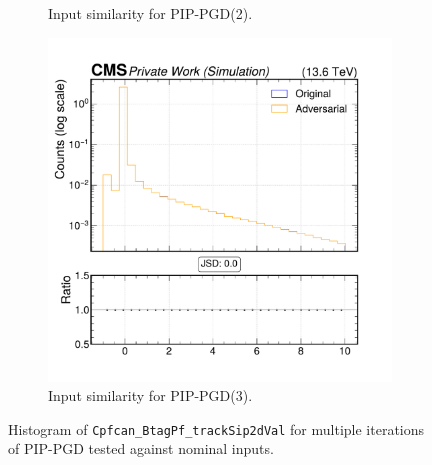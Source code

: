 \begin{figure}[htbp]
\begin{subfigure}[t]{0.32\textwidth}
    \caption*{Input similarity for PIP-PGD(2).}
  \end{subfigure}\hfill
  \begin{subfigure}[t]{0.32\textwidth}
    \includegraphics[width=\linewidth]{media/output/features/compare/combined_it_3/cmp_cpf_arr_Cpfcan_BtagPf_trackSip2dVal.pdf}
    \caption*{Input similarity for PIP-PGD(3).}
  \end{subfigure}

  \caption*{Histogram of \texttt{Cpfcan\_BtagPf\_trackSip2dVal} for multiple iterations of PIP-PGD tested against nominal inputs.}
  \label{fig:combined_input_Cpfcan_BtagPf_trackSip2dVal}
\end{figure}

